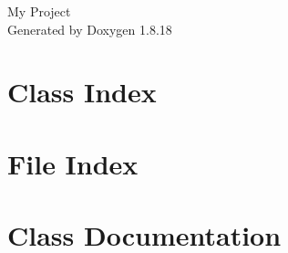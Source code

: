 \let\mypdfximage\pdfximage\def\pdfximage{\immediate\mypdfximage}\documentclass[twoside]{book}
\newcommand{\+}{\discretionary{\mbox{\scriptsize$\hookleftarrow$}}{}{}}
\newcommand{\clearemptydoublepage}{%
  \newpage{\pagestyle{empty}\cleardoublepage}%
}
\begin{document}
\hypersetup{pageanchor=false,
             bookmarksnumbered=true,
             pdfencoding=unicode
            }
\begin{titlepage}
\vspace*{7cm}
\begin{center}%
{\Large My Project }\\
\vspace*{1cm}
{\large Generated by Doxygen 1.8.18}\\
\end{center}
\end{titlepage}
\clearemptydoublepage
{}
\tableofcontents
\clearemptydoublepage
{}
\hypersetup{pageanchor=true}

\chapter{Class Index}

\chapter{File Index}

\chapter{Class Documentation}







































\end{document}
